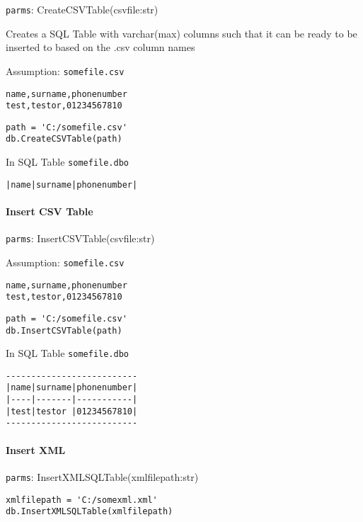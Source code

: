 \texttt{parms}: CreateCSVTable(csvfile:str)

Creates a SQL Table with varchar(max) columns such that it can be ready
to be inserted to based on the .csv column names

Assumption: \texttt{somefile.csv}

\begin{verbatim}
name,surname,phonenumber
test,testor,01234567810
\end{verbatim}

\begin{verbatim}
path = 'C:/somefile.csv'
db.CreateCSVTable(path)
\end{verbatim}

In SQL Table \texttt{somefile.dbo}

\begin{verbatim}
|name|surname|phonenumber|
\end{verbatim}

\hypertarget{insert-csv-table}{%
\paragraph{Insert CSV Table}\label{insert-csv-table}}

\texttt{parms}: InsertCSVTable(csvfile:str)

Assumption: \texttt{somefile.csv}

\begin{verbatim}
name,surname,phonenumber
test,testor,01234567810
\end{verbatim}

\begin{verbatim}
path = 'C:/somefile.csv'
db.InsertCSVTable(path)
\end{verbatim}

In SQL Table \texttt{somefile.dbo}

\begin{verbatim}
--------------------------
|name|surname|phonenumber|
|----|-------|-----------|
|test|testor |01234567810|
--------------------------
\end{verbatim}

\hypertarget{insert-xml}{%
\paragraph{Insert XML}\label{insert-xml}}

\texttt{parms}: InsertXMLSQLTable(xmlfilepath:str)

\begin{verbatim}
xmlfilepath = 'C:/somexml.xml'
db.InsertXMLSQLTable(xmlfilepath)
\end{verbatim}
